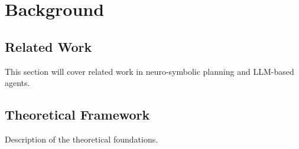 \chapter{Background}

\section{Related Work}

This section will cover related work in neuro-symbolic planning and LLM-based agents.

\section{Theoretical Framework}

Description of the theoretical foundations.
